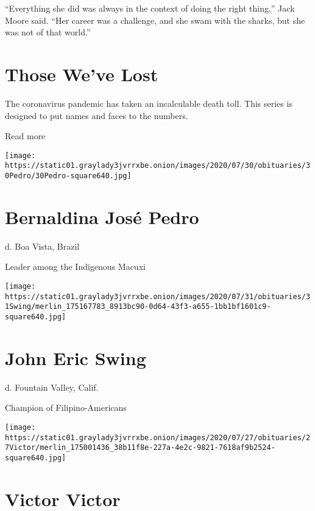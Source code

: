 ``Everything she did was always in the context of doing the right
thing,'' Jack Moore said. ``Her career was a challenge, and she swam
with the sharks, but she was not of that world.''

\href{https://www.nytimes3xbfgragh.onion/interactive/2020/obituaries/people-died-coronavirus-obituaries.html?action=click\&pgtype=Article\&state=default\&region=BELOW_MAIN_CONTENT\&context=covid_obits_promo}{}

\hypertarget{those-weve-lost}{%
\section{Those We've Lost}\label{those-weve-lost}}

The coronavirus pandemic has taken an incalculable death toll. This
series is designed to put names and faces to the numbers.

Read more

\texttt{[image: https://static01.graylady3jvrrxbe.onion/images/2020/07/30/obituaries/30Pedro/30Pedro-square640.jpg]}

\hypertarget{bernaldina-josuxe9-pedro}{%
\section{Bernaldina José Pedro}\label{bernaldina-josuxe9-pedro}}

d. Boa Vista, Brazil

Leader among the Indigenous Macuxi

\texttt{[image: https://static01.graylady3jvrrxbe.onion/images/2020/07/31/obituaries/31Swing/merlin\_175167783\_8913bc90-0d64-43f3-a655-1bb1bf1601c9-square640.jpg]}

\hypertarget{john-eric-swing}{%
\section{John Eric Swing}\label{john-eric-swing}}

d. Fountain Valley, Calif.

Champion of Filipino-Americans

\texttt{[image: https://static01.graylady3jvrrxbe.onion/images/2020/07/27/obituaries/27Victor/merlin\_175001436\_38b11f8e-227a-4e2c-9821-7618af9b2524-square640.jpg]}

\hypertarget{victor-victor}{%
\section{Victor Victor}\label{victor-victor}}

